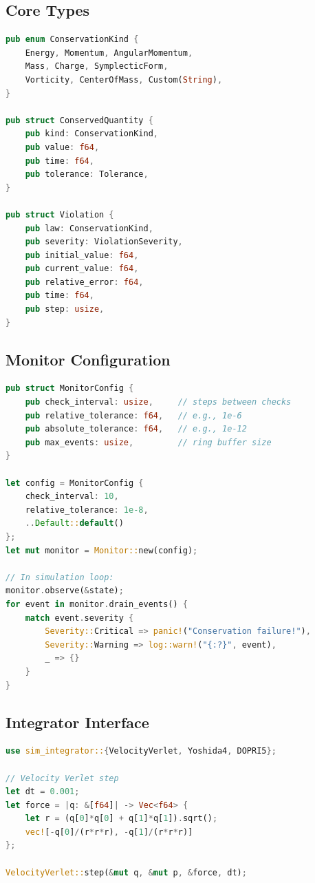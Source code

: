\documentclass[11pt,a4paper]{article}
\begin{document}
\subsection{Core Types}

\begin{lstlisting}[language=Rust,caption={Core conservation law types.}]
pub enum ConservationKind {
    Energy, Momentum, AngularMomentum,
    Mass, Charge, SymplecticForm,
    Vorticity, CenterOfMass, Custom(String),
}

pub struct ConservedQuantity {
    pub kind: ConservationKind,
    pub value: f64,
    pub time: f64,
    pub tolerance: Tolerance,
}

pub struct Violation {
    pub law: ConservationKind,
    pub severity: ViolationSeverity,
    pub initial_value: f64,
    pub current_value: f64,
    pub relative_error: f64,
    pub time: f64,
    pub step: usize,
}
\end{lstlisting}

\subsection{Monitor Configuration}

\begin{lstlisting}[language=Rust,caption={Monitor configuration and usage.}]
pub struct MonitorConfig {
    pub check_interval: usize,     // steps between checks
    pub relative_tolerance: f64,   // e.g., 1e-6
    pub absolute_tolerance: f64,   // e.g., 1e-12
    pub max_events: usize,         // ring buffer size
}

let config = MonitorConfig {
    check_interval: 10,
    relative_tolerance: 1e-8,
    ..Default::default()
};
let mut monitor = Monitor::new(config);

// In simulation loop:
monitor.observe(&state);
for event in monitor.drain_events() {
    match event.severity {
        Severity::Critical => panic!("Conservation failure!"),
        Severity::Warning => log::warn!("{:?}", event),
        _ => {}
    }
}
\end{lstlisting}

\subsection{Integrator Interface}

\begin{lstlisting}[language=Rust,caption={Using integrators.}]
use sim_integrator::{VelocityVerlet, Yoshida4, DOPRI5};

// Velocity Verlet step
let dt = 0.001;
let force = |q: &[f64]| -> Vec<f64> {
    let r = (q[0]*q[0] + q[1]*q[1]).sqrt();
    vec![-q[0]/(r*r*r), -q[1]/(r*r*r)]
};

VelocityVerlet::step(&mut q, &mut p, &force, dt);
\end{lstlisting}
\end{document}
